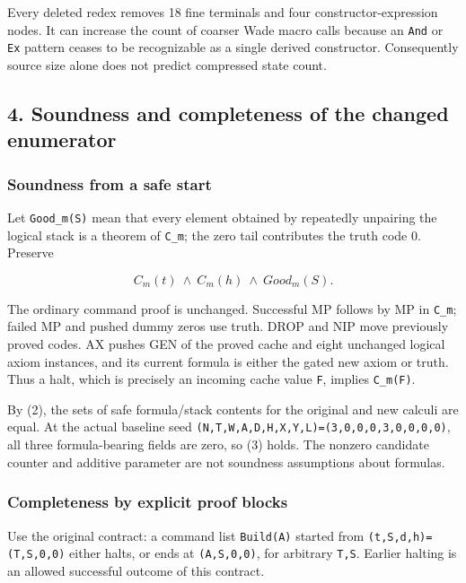 Every deleted redex removes 18 fine terminals and four
constructor-expression nodes. It can increase the count of coarser Wade
macro calls because an \texttt{And} or \texttt{Ex} pattern ceases to be
recognizable as a single derived constructor. Consequently source size
alone does not predict compressed state count.

\hypertarget{soundness-and-completeness-of-the-changed-enumerator}{%
\subsection{4. Soundness and completeness of the changed
enumerator}\label{soundness-and-completeness-of-the-changed-enumerator}}

\hypertarget{soundness-from-a-safe-start}{%
\subsubsection{Soundness from a safe
start}\label{soundness-from-a-safe-start}}

Let \texttt{Good\_m(S)} mean that every element obtained by repeatedly
unpairing the logical stack is a theorem of \texttt{C\_m}; the zero tail
contributes the truth code 0. Preserve

\[
C_m(t)\ \land\ C_m(h)\ \land\ Good_m(S).
\tag{3}
\]

The ordinary command proof is unchanged. Successful MP follows by MP in
\texttt{C\_m}; failed MP and pushed dummy zeros use truth. DROP and NIP
move previously proved codes. AX pushes GEN of the proved cache and
eight unchanged logical axiom instances, and its current formula is
either the gated new axiom or truth. Thus a halt, which is precisely an
incoming cache value \texttt{F}, implies \texttt{C\_m(F)}.

By (2), the sets of safe formula/stack contents for the original and new
calculi are equal. At the actual baseline seed
\texttt{(N,T,W,A,D,H,X,Y,L)=(3,0,0,0,3,0,0,0,0)}, all three
formula-bearing fields are zero, so (3) holds. The nonzero candidate
counter and additive parameter are not soundness assumptions about
formulas.

\hypertarget{completeness-by-explicit-proof-blocks}{%
\subsubsection{Completeness by explicit proof
blocks}\label{completeness-by-explicit-proof-blocks}}

Use the original contract: a command list \texttt{Build(A)} started from
\texttt{(t,S,d,h)=(T,S,0,0)} either halts, or ends at
\texttt{(A,S,0,0)}, for arbitrary \texttt{T,S}. Earlier halting is an
allowed successful outcome of this contract.

